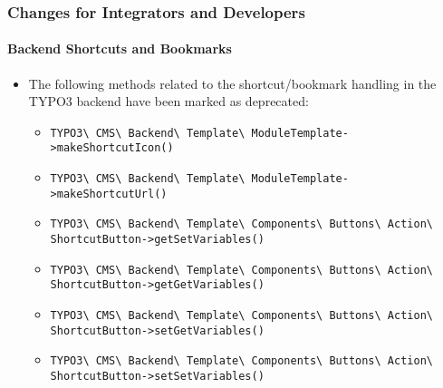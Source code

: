 %

\begin{frame}[fragile]
	\frametitle{Changes for Integrators and Developers}
	\framesubtitle{Backend Shortcuts and Bookmarks}

	\begin{itemize}
		\item The following methods related to the shortcut/bookmark handling in
			the TYPO3 backend have been marked as deprecated:

			\begin{itemize}\tiny
				\item \texttt{TYPO3\textbackslash
					CMS\textbackslash
					Backend\textbackslash
					Template\textbackslash
					ModuleTemplate->makeShortcutIcon()}
				\item \texttt{TYPO3\textbackslash
					CMS\textbackslash
					Backend\textbackslash
					Template\textbackslash
					ModuleTemplate->makeShortcutUrl()}
				\item \texttt{TYPO3\textbackslash
					CMS\textbackslash
					Backend\textbackslash
					Template\textbackslash
					Components\textbackslash
					Buttons\textbackslash
					Action\textbackslash
					ShortcutButton->getSetVariables()}
				\item \texttt{TYPO3\textbackslash
					CMS\textbackslash
					Backend\textbackslash
					Template\textbackslash
					Components\textbackslash
					Buttons\textbackslash
					Action\textbackslash
					ShortcutButton->getGetVariables()}
				\item \texttt{TYPO3\textbackslash
					CMS\textbackslash
					Backend\textbackslash
					Template\textbackslash
					Components\textbackslash
					Buttons\textbackslash
					Action\textbackslash
					ShortcutButton->setGetVariables()}
				\item \texttt{TYPO3\textbackslash
					CMS\textbackslash
					Backend\textbackslash
					Template\textbackslash
					Components\textbackslash
					Buttons\textbackslash
					Action\textbackslash
					ShortcutButton->setSetVariables()}
			\end{itemize}\normalsize

	\end{itemize}

\end{frame}

